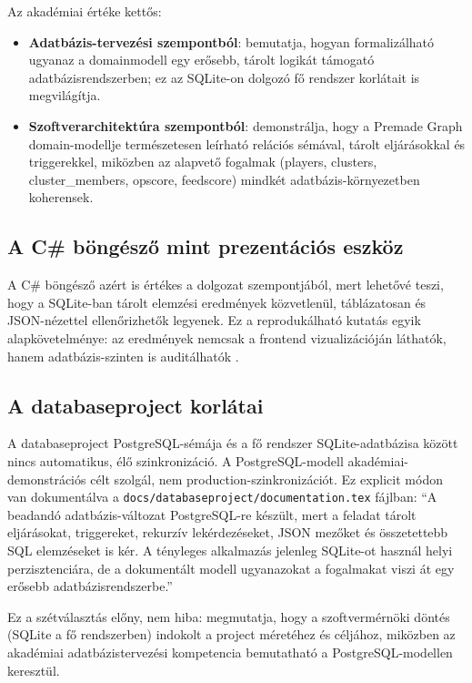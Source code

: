 ﻿\documentclass[a4paper,12pt]{report}
\begin{document}
Az akadémiai értéke kettős:
\begin{itemize}
    \item \textbf{Adatbázis-tervezési szempontból}: bemutatja, hogyan formalizálható ugyanaz a domainmodell egy erősebb, tárolt logikát támogató adatbázisrendszerben; ez az SQLite-on dolgozó fő rendszer korlátait is megvilágítja.
    \item \textbf{Szoftverarchitektúra szempontból}: demonstrálja, hogy a Premade Graph domain-modellje természetesen leírható relációs sémával, tárolt eljárásokkal és triggerekkel, miközben az alapvető fogalmak (players, clusters, cluster\_members, opscore, feedscore) mindkét adatbázis-környezetben koherensek.
\end{itemize}

\subsection{A C\# böngésző mint prezentációs eszköz}

A C\# böngésző azért is értékes a dolgozat szempontjából, mert lehetővé teszi, hogy a SQLite-ban tárolt elemzési eredmények közvetlenül, táblázatosan és JSON-nézettel ellenőrizhetők legyenek. Ez a reprodukálható kutatás egyik alapkövetelménye: az eredmények nemcsak a frontend vizualizációján láthatók, hanem adatbázis-szinten is auditálhatók \cite{sandve2013}.

\subsection{A databaseproject korlátai}

A databaseproject PostgreSQL-sémája és a fő rendszer SQLite-adatbázisa között nincs automatikus, élő szinkronizáció. A PostgreSQL-modell akadémiai-demonstrációs célt szolgál, nem production-szinkronizációt. Ez explicit módon van dokumentálva a \texttt{docs/databaseproject/documentation.tex} fájlban: ``A beadandó adatbázis-változat PostgreSQL-re készült, mert a feladat tárolt eljárásokat, triggereket, rekurzív lekérdezéseket, JSON mezőket és összetettebb SQL elemzéseket is kér. A tényleges alkalmazás jelenleg SQLite-ot használ helyi perzisztenciára, de a dokumentált modell ugyanazokat a fogalmakat viszi át egy erősebb adatbázisrendszerbe.''

Ez a szétválasztás előny, nem hiba: megmutatja, hogy a szoftvermérnöki döntés (SQLite a fő rendszerben) indokolt a project méretéhez és céljához, miközben az akadémiai adatbázistervezési kompetencia bemutatható a PostgreSQL-modellen keresztül.
\end{document}
